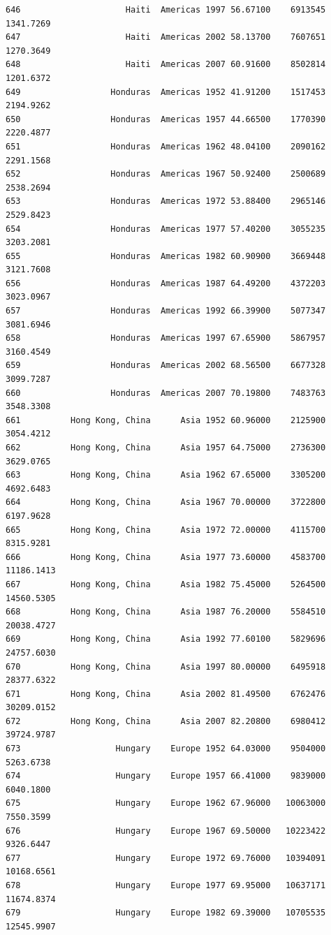 \documentclass[
  letterpaper,
  DIV=11,
  numbers=noendperiod]{scrreprt}
\begin{document}
\begin{verbatim}
646                     Haiti  Americas 1997 56.67100    6913545   1341.7269
647                     Haiti  Americas 2002 58.13700    7607651   1270.3649
648                     Haiti  Americas 2007 60.91600    8502814   1201.6372
649                  Honduras  Americas 1952 41.91200    1517453   2194.9262
650                  Honduras  Americas 1957 44.66500    1770390   2220.4877
651                  Honduras  Americas 1962 48.04100    2090162   2291.1568
652                  Honduras  Americas 1967 50.92400    2500689   2538.2694
653                  Honduras  Americas 1972 53.88400    2965146   2529.8423
654                  Honduras  Americas 1977 57.40200    3055235   3203.2081
655                  Honduras  Americas 1982 60.90900    3669448   3121.7608
656                  Honduras  Americas 1987 64.49200    4372203   3023.0967
657                  Honduras  Americas 1992 66.39900    5077347   3081.6946
658                  Honduras  Americas 1997 67.65900    5867957   3160.4549
659                  Honduras  Americas 2002 68.56500    6677328   3099.7287
660                  Honduras  Americas 2007 70.19800    7483763   3548.3308
661          Hong Kong, China      Asia 1952 60.96000    2125900   3054.4212
662          Hong Kong, China      Asia 1957 64.75000    2736300   3629.0765
663          Hong Kong, China      Asia 1962 67.65000    3305200   4692.6483
664          Hong Kong, China      Asia 1967 70.00000    3722800   6197.9628
665          Hong Kong, China      Asia 1972 72.00000    4115700   8315.9281
666          Hong Kong, China      Asia 1977 73.60000    4583700  11186.1413
667          Hong Kong, China      Asia 1982 75.45000    5264500  14560.5305
668          Hong Kong, China      Asia 1987 76.20000    5584510  20038.4727
669          Hong Kong, China      Asia 1992 77.60100    5829696  24757.6030
670          Hong Kong, China      Asia 1997 80.00000    6495918  28377.6322
671          Hong Kong, China      Asia 2002 81.49500    6762476  30209.0152
672          Hong Kong, China      Asia 2007 82.20800    6980412  39724.9787
673                   Hungary    Europe 1952 64.03000    9504000   5263.6738
674                   Hungary    Europe 1957 66.41000    9839000   6040.1800
675                   Hungary    Europe 1962 67.96000   10063000   7550.3599
676                   Hungary    Europe 1967 69.50000   10223422   9326.6447
677                   Hungary    Europe 1972 69.76000   10394091  10168.6561
678                   Hungary    Europe 1977 69.95000   10637171  11674.8374
679                   Hungary    Europe 1982 69.39000   10705535  12545.9907

\end{verbatim}
\end{document}
